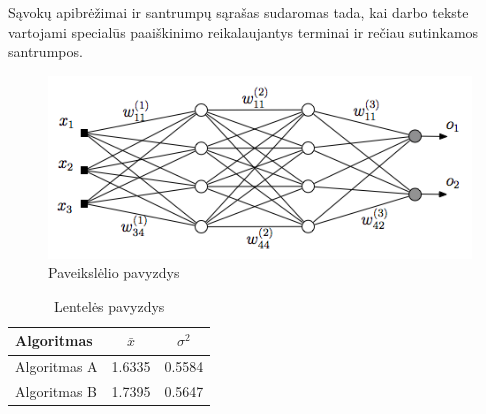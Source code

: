 \documentclass[
    english, %
]{VUMIFPSkursinis}
\begin{document}
\printbibliography[heading=bibintoc]  %

Sąvokų apibrėžimai ir santrumpų sąrašas sudaromas tada, kai darbo tekste
vartojami specialūs paaiškinimo reikalaujantys terminai ir rečiau sutinkamos
santrumpos.


\begin{figure}[H]
    \centering
    \includegraphics[scale=0.5]{img/MLP}
    \caption{Paveikslėlio pavyzdys}
    \label{img:mlp}
\end{figure}



\begin{table}[H]\footnotesize
    \centering
    \caption{Lentelės pavyzdys}
    {\begin{tabular}{|l|c|c|} \hline
            Algoritmas   & $\bar{x}$ & $\sigma^{2}$ \\
            \hline
            Algoritmas A & 1.6335    & 0.5584       \\
            Algoritmas B & 1.7395    & 0.5647       \\
            \hline
        \end{tabular}}
    \label{tab:table example}
\end{table}
\end{document}

